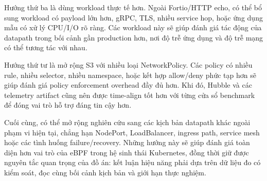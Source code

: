 Hướng thứ ba là dùng workload thực tế hơn. Ngoài Fortio/HTTP echo, có thể bổ sung workload có payload lớn hơn, gRPC, TLS, nhiều service hop, hoặc ứng dụng mẫu có xử lý CPU/I/O rõ ràng. Các workload này sẽ giúp đánh giá tác động của datapath trong bối cảnh gần production hơn, nơi độ trễ ứng dụng và độ trễ mạng có thể tương tác với nhau.

Hướng thứ tư là mở rộng S3 với nhiều loại NetworkPolicy. Các policy có nhiều rule, nhiều selector, nhiều namespace, hoặc kết hợp allow/deny phức tạp hơn sẽ giúp đánh giá policy enforcement overhead đầy đủ hơn. Khi đó, Hubble và các telemetry artifact cũng nên được time-align tốt hơn với từng cửa sổ benchmark để đóng vai trò hỗ trợ đáng tin cậy hơn.

Cuối cùng, có thể mở rộng nghiên cứu sang các kịch bản datapath khác ngoài phạm vi hiện tại, chẳng hạn NodePort, LoadBalancer, ingress path, service mesh hoặc các tình huống failure/recovery. Những hướng này sẽ giúp đánh giá toàn diện hơn vai trò của eBPF trong hệ sinh thái Kubernetes, đồng thời giữ được nguyên tắc quan trọng của đồ án: kết luận hiệu năng phải dựa trên dữ liệu đo có kiểm soát, đọc cùng bối cảnh kịch bản và giới hạn thực nghiệm.

